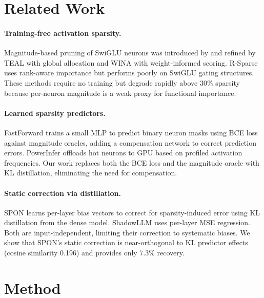 \documentclass[11pt,a4paper]{article}
\begin{document}
\section{Related Work}

\paragraph{Training-free activation sparsity.}
Magnitude-based pruning of SwiGLU neurons was introduced by \citet{liu2023deja} and refined by TEAL \citep{liu2024teal} with global allocation and WINA \citep{huang2024wina} with weight-informed scoring. R-Sparse \citep{zhang2024rsparse} uses rank-aware importance but performs poorly on SwiGLU gating structures. These methods require no training but degrade rapidly above 30\% sparsity because per-neuron magnitude is a weak proxy for functional importance.

\paragraph{Learned sparsity predictors.}
FastForward \citep{wang2024fastforward} trains a small MLP to predict binary neuron masks using BCE loss against magnitude oracles, adding a compensation network to correct prediction errors. PowerInfer \citep{song2024powerinfer} offloads hot neurons to GPU based on profiled activation frequencies. Our work replaces both the BCE loss and the magnitude oracle with KL distillation, eliminating the need for compensation.

\paragraph{Static correction via distillation.}
SPON \citep{huang2024spon} learns per-layer bias vectors to correct for sparsity-induced error using KL distillation from the dense model. ShadowLLM \citep{he2024shadowllm} uses per-layer MSE regression. Both are input-independent, limiting their correction to systematic biases. We show that SPON's static correction is near-orthogonal to KL predictor effects (cosine similarity 0.196) and provides only 7.3\% recovery.

\section{Method}
\label{sec:method}
\end{document}
